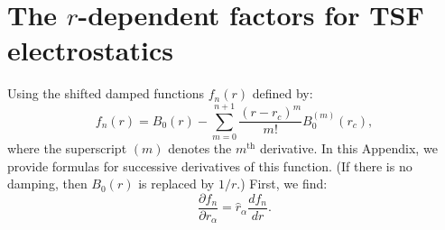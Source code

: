 \section{The $r$-dependent factors for TSF electrostatics}
\label{radialTSF}

Using the shifted damped functions $f_n(r)$ defined by:
%
\begin{equation}
f_n(r)= B_0(r) -\sum_{m=0}^{n+1} \frac {(r-r_c)^m}{m!} B_0^{(m)}(r_c)  ,
\end{equation}
%
where the superscript $(m)$ denotes the $m^\mathrm{th}$ derivative. In
this Appendix, we provide formulas for successive derivatives of this
function.  (If there is no damping, then $B_0(r)$ is replaced by
$1/r$.)  First, we find:
%
\begin{equation}
\frac{\partial f_n}{\partial r_\alpha}=\hat{r}_\alpha \frac{d f_n}{d r} .
\end{equation}
%

